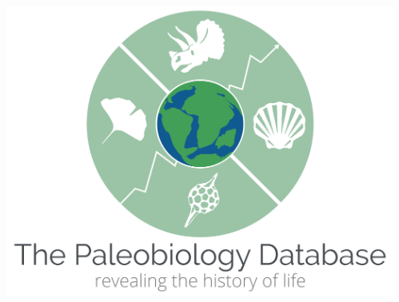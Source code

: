 \documentclass{beamer}
\begin{document}
\begin{frame}
\begin{columns}
\begin{column}{0.35\textwidth}
\begin{itemize}
      \end{itemize}
    \end{column}
    \begin{column}{0.25\textwidth}
      \includegraphics[width=\textwidth,height=\textheight,keepaspectratio=true]{figure/paleodb}
    \end{column}
  \end{columns}
\end{frame}
\end{document}
